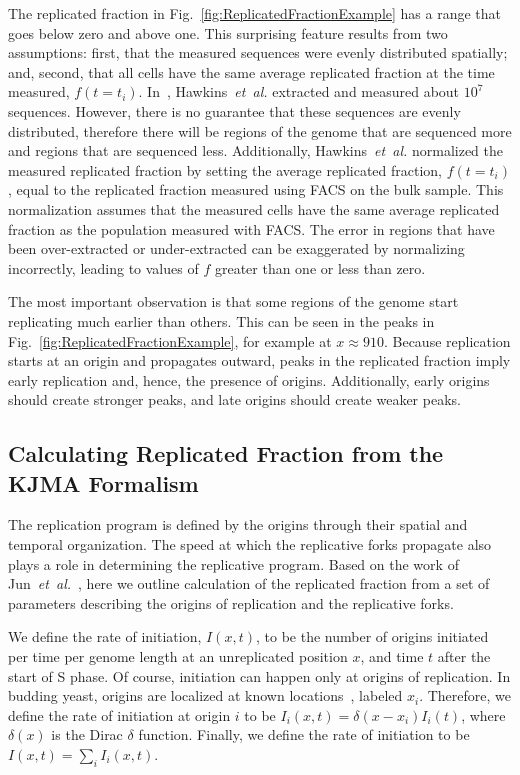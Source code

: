 		The replicated fraction in Fig.~\ref{fig:ReplicatedFractionExample} has a range that goes below zero and above one.
		This surprising feature results from two assumptions: first, that the measured sequences were evenly distributed spatially; and, second, that all cells have the same average replicated fraction at the time measured, $f(t=t_i)$.
		In~\cite{StochasticTermination}, Hawkins~\emph{et~al.} extracted and measured about $10^7$ sequences.
		However, there is no guarantee that these sequences are evenly distributed, therefore there will be regions of the genome that are sequenced more and regions that are sequenced less.
		Additionally, Hawkins~\emph{et~al.} normalized the measured replicated fraction by setting the average replicated fraction, $f(t=t_i)$, equal to the replicated fraction measured using FACS on the bulk sample.
		This normalization assumes that the measured cells have the same average replicated fraction as the population measured with FACS.
		The error in regions that have been over-extracted or under-extracted can be exaggerated by normalizing incorrectly, leading to values of $f$ greater than one or less than zero.
		
		The most important observation is that some regions of the genome start replicating much earlier than others.
		This can be seen in the peaks in Fig.~\ref{fig:ReplicatedFractionExample}, for example at $x \approx 910$.
		Because replication starts at an origin and propagates outward, peaks in the replicated fraction imply early replication and, hence, the presence of origins.
		Additionally, early origins should create stronger peaks, and late origins should create weaker peaks.
		
		
		\subsection{Calculating Replicated Fraction from the KJMA Formalism}
		\label{subsec:KJMA}
		
		The replication program is defined by the origins through their spatial and temporal organization.
		The speed at which the replicative forks propagate also plays a role in determining the replicative program.
		Based on the work of Jun~\emph{et~al.}~\cite{KJMA1}, here we outline calculation of the replicated fraction from a set of parameters describing the origins of replication and the replicative forks.
		
		We define the rate of initiation, $I(x,t)$, to be the number of origins initiated per time per genome length at an unreplicated position $x$, and time $t$ after the start of S phase.
		Of course, initiation can happen only at origins of replication.
		In budding yeast, origins are localized at known locations~\cite{OriDB}, labeled $x_i$.
		Therefore, we define the rate of initiation at origin $i$ to be $I_i(x,t)=\delta(x-x_i)I_i(t)$, where $\delta(x)$ is the Dirac $\delta$ function.
		Finally, we define the rate of initiation to be $I(x,t) = \sum\limits_i I_i(x,t)$.
		
